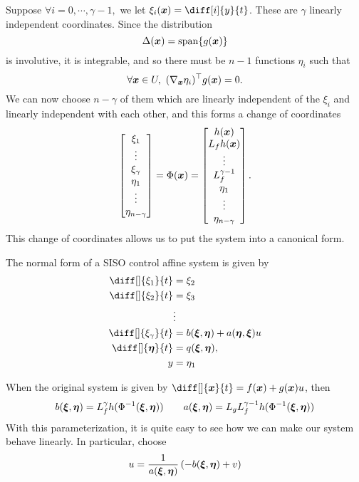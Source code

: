 Suppose $\forall i=0,\cdots,\gamma-1,$ we let $\xi_i(\bs{x}) = \diff[i]{y}{t}$.
These are $\gamma$ linearly independent coordinates. Since the distribution \[
	\Delta(\boldsymbol{x}) = \text{span}\{g(\boldsymbol{x})\}
\]
is involutive, it is integrable, and so there must be $n-1$ functions $\eta_i$
such that \[
	\forall \bs{x}\in U,\ (\nabla_{\bs{x}}\eta_i)^\top g(\bs{x}) = 0.
\]
We can now choose $n-\gamma$ of them which are linearly independent of the
$\xi_i$ and linearly independent with each other, and this forms a change of
coordinates \[
	\begin{bmatrix}
		\xi_1\\
		\vdots\\
		\xi_{\gamma}\\
		\eta_1\\
		\vdots\\
		\eta_{n-\gamma}
	\end{bmatrix} = \Phi(\boldsymbol{x}) = \begin{bmatrix}
		h(\boldsymbol{x})\\
		L_fh(\boldsymbol{x})\\
		\vdots\\
		L_f^{\gamma-1}\\
		\eta_1\\
		\vdots\\
		\eta_{n-\gamma}
	\end{bmatrix}.
\]
This change of coordinates allows us to put the system into a canonical form.
\begin{definition}
	The normal form of a SISO control affine system is given by \[
		\begin{aligned}
			\diff[]{\xi_1}{t} &= \xi_2\\
			\diff[]{\xi_2}{t} &= \xi_3\\
			&\vdots\\
			\diff[]{\xi_{\gamma}}{t} &= b(\bs{\xi}, \bs{\eta}) + a(\bs{\eta},
			\bs{\xi})u\\
			\diff[]{\bs{\eta}}{t} &= q(\bs{\xi}, \bs{\eta}),\\
			y &= \eta_1
		\end{aligned}
	\]
	\label{defn:normal-form-siso}
\end{definition}
When the original system is given by $\diff[]{\bs{x}}{t} = f(\bs{x})+g(\bs{x})u$, then
\[
	b(\boldsymbol{\xi},\boldsymbol{\eta}) = L_f^\gamma h(\Phi^{-1}(\boldsymbol{\xi}, \boldsymbol{\eta})) \qquad
	a(\boldsymbol{\xi}, \boldsymbol{\eta}) = L_gL_f^{\gamma-1} h(\Phi^{-1}(\boldsymbol{\xi}, \boldsymbol{\eta}))
\]
With this parameterization, it is quite easy to see how we can make our system
behave linearly. In particular, choose \[
	u = \frac{1}{a(\boldsymbol{\xi}, \boldsymbol{\eta})}\left(-b(\boldsymbol{\xi}, \boldsymbol{\eta}) +
	v\right)
\]
